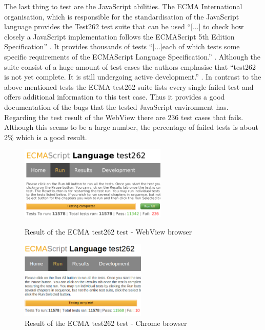 The last thing to test are the JavaScript abilities.
The ECMA International organisation, which is responsible for the standardisation of the JavaScript language provides the Test262 test suite that can be used \enquote{[...] to check how closely a JavaScript implementation follows the ECMAScript 5th Edition Specification} \autocite{tech-ana:ECMAScript}.
It provides thousands of tests \enquote{[...]each of which tests some specific requirements of the ECMAScript Language Specification.} \autocite{tech-ana:ECMAtest}.
Although the suite consist of a huge amount of test cases the authors emphasise that \enquote{test262 is not yet complete. It is still undergoing active development.} \autocite{tech-ana:ECMAtest}.
In contrast to the above mentioned tests the ECMA test262 suite lists every single failed test and offers additional information to this test case.
Thus it provides a good documentation of the bugs that the tested JavaScript environment has.
Regarding the test result of the WebView there are 236 test cases that fails.
Although this seems to be a large number, the percentage of failed tests is about 2\% which is a good result.
   
\begin{figure}
\begin{minipage}[t]{7cm}
	\centering
	\includegraphics[width=7cm]{./img/tech-ana/ecma_result_webview_small.png}
	\caption{Result of the ECMA test262 test - WebView browser}
	\label{fig:ecma_webview}
\end{minipage}
\hfill
\begin{minipage}[t]{6cm}
	\centering
	\includegraphics[width=6cm]{./img/tech-ana/ecma_result_chrome_small.png}
	\caption{Result of the ECMA test262 test - Chrome browser}
	\label{fig:ecma_chrome}
\end{minipage}
\end{figure}

